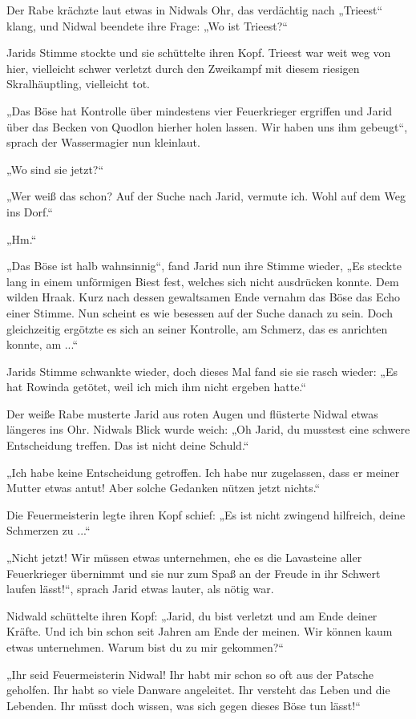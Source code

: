 Der Rabe krächzte laut etwas in Nidwals Ohr, das verdächtig nach „Trieest“ klang, und Nidwal beendete ihre Frage: „Wo ist Trieest?“

Jarids Stimme stockte und sie schüttelte ihren Kopf. Trieest war weit weg von hier, vielleicht schwer verletzt durch den Zweikampf mit diesem riesigen Skralhäuptling, vielleicht tot.

„Das Böse hat Kontrolle über mindestens vier Feuerkrieger ergriffen und Jarid über das Becken von Quodlon hierher holen lassen. Wir haben uns ihm gebeugt“, sprach der Wassermagier nun kleinlaut.

„Wo sind sie jetzt?“

„Wer weiß das schon? Auf der Suche nach Jarid, vermute ich. Wohl auf dem Weg ins Dorf.“

„Hm.“

„Das Böse ist halb wahnsinnig“, fand Jarid nun ihre Stimme wieder, „Es steckte lang in einem unförmigen Biest fest, welches sich nicht ausdrücken konnte. Dem wilden Hraak. Kurz nach dessen gewaltsamen Ende vernahm das Böse das Echo einer Stimme. Nun scheint es wie besessen auf der Suche danach zu sein. Doch gleichzeitig ergötzte es sich an seiner Kontrolle, am Schmerz, das es anrichten konnte, am ...“

Jarids Stimme schwankte wieder, doch dieses Mal fand sie sie rasch wieder: „Es hat Rowinda getötet, weil ich mich ihm nicht ergeben hatte.“

Der weiße Rabe musterte Jarid aus roten Augen und flüsterte Nidwal etwas längeres ins Ohr. Nidwals Blick wurde weich: „Oh Jarid, du musstest eine schwere Entscheidung treffen. Das ist nicht deine Schuld.“

„Ich habe keine Entscheidung getroffen. Ich habe nur zugelassen, dass er meiner Mutter etwas antut! Aber solche Gedanken nützen jetzt nichts.“

Die Feuermeisterin legte ihren Kopf schief: „Es ist nicht zwingend hilfreich, deine Schmerzen zu ...“

„Nicht jetzt! Wir müssen etwas unternehmen, ehe es die Lavasteine aller Feuerkrieger übernimmt und sie nur zum Spaß an der Freude in ihr Schwert laufen lässt!“, sprach Jarid etwas lauter, als nötig war.

Nidwald schüttelte ihren Kopf: „Jarid, du bist verletzt und am Ende deiner Kräfte. Und ich bin schon seit Jahren am Ende der meinen. Wir können kaum etwas unternehmen. Warum bist du zu mir gekommen?“

„Ihr seid Feuermeisterin Nidwal! Ihr habt mir schon so oft aus der Patsche geholfen. Ihr habt so viele Danware angeleitet. Ihr versteht das Leben und die Lebenden. Ihr müsst doch wissen, was sich gegen dieses Böse tun lässt!“


